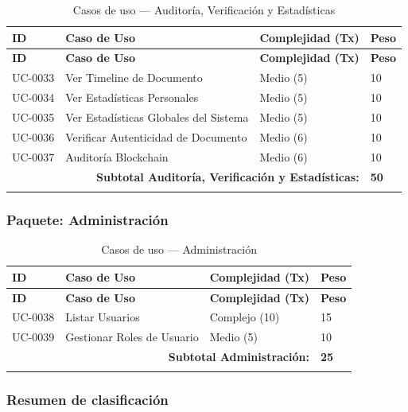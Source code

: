\documentclass[11pt, a4paper]{article}
\begin{document}
\begin{longtable}{|p{1.8cm}|p{6.5cm}|p{3cm}|p{1.5cm}|}
\hline
\textbf{ID} & \textbf{Caso de Uso} & \textbf{Complejidad (Tx)} & \textbf{Peso} \\
\hline
\endfirsthead
\hline
\textbf{ID} & \textbf{Caso de Uso} & \textbf{Complejidad (Tx)} & \textbf{Peso} \\
\hline
\endhead
UC-0033 & Ver Timeline de Documento & Medio (5) & 10 \\
\hline
UC-0034 & Ver Estadísticas Personales & Medio (5) & 10 \\
\hline
UC-0035 & Ver Estadísticas Globales del Sistema & Medio (5) & 10 \\
\hline
UC-0036 & Verificar Autenticidad de Documento & Medio (6) & 10 \\
\hline
UC-0037 & Auditoría Blockchain & Medio (6) & 10 \\
\hline
\multicolumn{3}{|r|}{\textbf{Subtotal Auditoría, Verificación y Estadísticas:}} & \textbf{50} \\
\hline
\caption{Casos de uso --- Auditoría, Verificación y Estadísticas}\label{tab:uc-auditoria}
\end{longtable}

\subsubsection*{Paquete: Administración}

\begin{longtable}{|p{1.8cm}|p{6.5cm}|p{3cm}|p{1.5cm}|}
\hline
\textbf{ID} & \textbf{Caso de Uso} & \textbf{Complejidad (Tx)} & \textbf{Peso} \\
\hline
\endfirsthead
\hline
\textbf{ID} & \textbf{Caso de Uso} & \textbf{Complejidad (Tx)} & \textbf{Peso} \\
\hline
\endhead
UC-0038 & Listar Usuarios & Complejo (10) & 15 \\
\hline
UC-0039 & Gestionar Roles de Usuario & Medio (5) & 10 \\
\hline
\multicolumn{3}{|r|}{\textbf{Subtotal Administración:}} & \textbf{25} \\
\hline
\caption{Casos de uso --- Administración}\label{tab:uc-administracion}
\end{longtable}

\subsubsection*{Resumen de clasificación}
\end{document}
